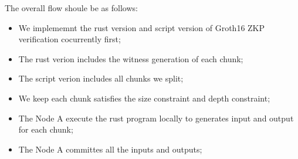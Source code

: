 The overall flow shoule be as follows:
\begin{itemize}
    \item We implememnt the rust version and script version of Groth16 ZKP verification cocurrently first;
    \item The rust verion includes the witness generation of each chunk;
    \item The script verion includes all chunks we split;
    \item We keep each chunk satisfies the size constraint and depth constraint;
    \item The Node A execute the rust program locally to generates input and output for each chunk;
    \item The Node A committes all the inputs and outputs;
\end{itemize}
